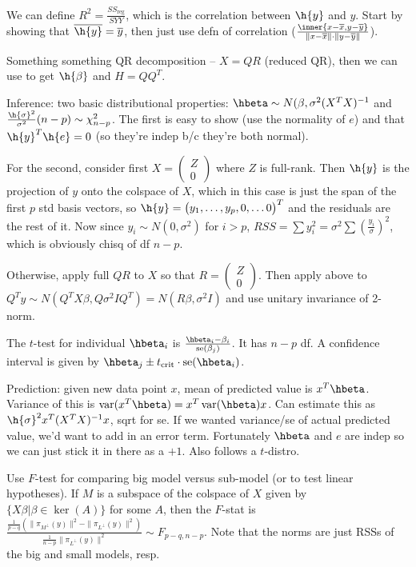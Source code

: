 \documentclass{article}
\newcommand{\conj}{\overline}
\newcommand{\openm}{\begin{pmatrix}}
\newcommand{\closem}{\end{pmatrix}}
\DeclareMathOperator{\var}{var}
\begin{document}
We can define $R^2=\frac{SS_\text{reg}}{SYY}$, which is the correlation between $\h{y}$ and $y$. Start by showing that $\conj{\h{y}}=\conj{y}$, then just use defn of correlation ($\frac{\inner{x-\conj{x},y-\conj{y}}}{\|x-\conj{x}\|\cdot\|y-\conj{y}\|}$). 

Something something QR decomposition -- $X=QR$ (reduced QR), then we can use to get $\h{\beta}$ and $H=QQ^T$.

Inference: two basic distributional properties: $\hbeta\sim N(\beta,\sigma^2(X^TX)^{-1}$ and $\frac{\h{\sigma}^2}{\sigma^2}(n-p)\sim\chi^2_{n-p}$. The first is easy to show (use the normality of $e$) and that $\h{y}^T\h{e}=0$ (so they're indep b/c they're both normal). 

For the second, consider first $X=\openm Z\\0\closem$ where $Z$ is full-rank. Then $\h{y}$ is the projection of $y$ onto the colspace of $X$, which in this case is just the span of the first $p$ std basis vectors, so $\h{y}=\openm y_1,\hdots,y_p,0,\hdots0\closem^T$ and the residuals are the rest of it. Now since $y_i\sim N(0,\sigma^2)$ for $i>p$, $RSS=\sum y_i^2=\sigma^2\sum\left(\frac{y_i}{\sigma}\right)^2$, which is obviously chisq of df $n-p$.

Otherwise, apply full $QR$ to $X$ so that $R=\openm Z\\0\closem$. Then apply above to $Q^Ty\sim N(Q^TX\beta,Q\sigma^2IQ^T)=N(R\beta,\sigma^2I)$ and use unitary invariance of 2-norm.

The $t$-test for individual $\hbeta_i$ is $\frac{\hbeta_i-\beta_i}{\text{se}(\beta_j)}$. It has $n-p$ df. A confidence interval is given by $\hbeta_j\pm t_\text{crit}\cdot\text{se}(\hbeta_i)$. 

Prediction: given new data point $x$, mean of predicted value is $x^T\hbeta$. Variance of this is $\var(x^T\hbeta)=x^T\var(\hbeta)x$. Can estimate this as $\h{\sigma}^2x^T(X^TX)^{-1}x$, sqrt for se. If we wanted variance/se of actual predicted value, we'd want to add in an error term. Fortunately $\hbeta$ and $e$ are indep so we can just stick it in there as a $+1$. Also follows a $t$-distro.

Use $F$-test for comparing big model versus sub-model (or to test linear hypotheses). If $M$ is a subspace of the colspace of $X$ given by $\{X\beta|\beta\in\ker(A)\}$ for some $A$, then the $F$-stat is $\frac{\frac{1}{p-q}(\|\pi_{M^\perp}(y)\|^2-\|\pi_{L^\perp}(y)\|^2)}{\frac{1}{n-p}\|\pi_{L^\perp}(y)\|^2}\sim F_{p-q,n-p}$. Note that the norms are just RSSs of the big and small models, resp.
\end{document}
